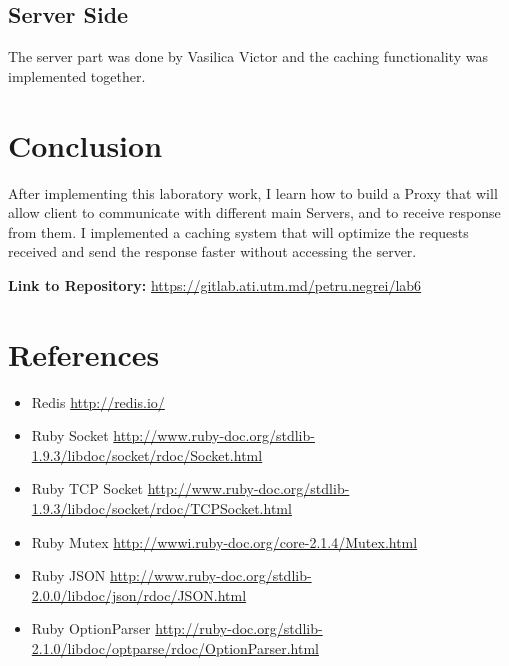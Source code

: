 \documentclass[12pt]{article}
\begin{document}
    \subsection{Server Side}

    The server part was done by Vasilica Victor and the caching functionality was implemented together.

    \section{Conclusion}

    After implementing this laboratory work, I learn how to build a Proxy that will allow client to communicate
    with different main Servers, and to receive response from them. I implemented a caching system
    that will optimize the requests received and send the response faster without accessing the server.

    \textbf{Link to Repository: } \url{https://gitlab.ati.utm.md/petru.negrei/lab6}

   \section{References}

   \begin{itemize}
      \item Redis \url{http://redis.io/}
      \item Ruby Socket \url{http://www.ruby-doc.org/stdlib-1.9.3/libdoc/socket/rdoc/Socket.html}
      \item Ruby TCP  Socket \url{http://www.ruby-doc.org/stdlib-1.9.3/libdoc/socket/rdoc/TCPSocket.html}
      \item Ruby Mutex \url{http://wwwi.ruby-doc.org/core-2.1.4/Mutex.html}
      \item Ruby JSON \url{http://www.ruby-doc.org/stdlib-2.0.0/libdoc/json/rdoc/JSON.html}
      \item Ruby OptionParser \url{http://ruby-doc.org/stdlib-2.1.0/libdoc/optparse/rdoc/OptionParser.html}
   \end{itemize}
\end{document}
